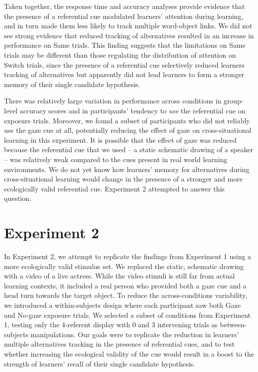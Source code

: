 \documentclass[authoryear, review]{elsarticle}
\begin{document}
Taken together, the response time and accuracy analyses provide evidence
that the presence of a referential cue modulated learners' attention
during learning, and in turn made them less likely to track multiple
word-object links. We did not see strong evidence that reduced tracking
of alternatives resulted in an increase in performance on Same trials.
This finding suggests that the limitations on Same trials may be
different than those regulating the distribution of attention on Switch
trials, since the presence of a referential cue selectively reduced
learners tracking of alternatives but apparently did not lead learners
to form a stronger memory of their single candidate hypothesis.

There was relatively large variation in performance across conditions in
group-level accuracy scores and in participants' tendency to \emph{use}
the referential cue on exposure trials. Moreover, we found a subset of
participants who did not reliably use the gaze cue at all, potentially
reducing the effect of gaze on cross-situational learning in this
experiment. It is possible that the effect of gaze was reduced because
the referential cue that we used -- a static schematic drawing of a
speaker -- was relatively weak compared to the cues present in real
world learning environments. We do not yet know how learners' memory for
alternatives during cross-situational learning would change in the
presence of a stronger and more ecologically valid referential cue.
Experiment 2 attempted to answer this question.

\section{Experiment 2}\label{experiment-2}

In Experiment 2, we attempt to replicate the findings from Experiment 1
using a more ecologically valid stimulus set. We replaced the static,
schematic drawing with a video of a live actress. While the video
stimuli is still far from actual learning contexts, it included a real
person who provided both a gaze cue and a head turn towards the target
object. To reduce the across-conditions variability, we introduced a
within-subjects design where each participant saw both Gaze and No-gaze
exposure trials. We selected a subset of conditions from Experiment 1,
testing only the 4-referent display with 0 and 3 intervening trials as
between-subjects manipulations. Our goals were to replicate the
reduction in learners' multiple alternatives tracking in the presence of
referential cues, and to test whether increasing the ecological validity
of the cue would result in a boost to the strength of learners' recall
of their single candidate hypothesis.
\end{document}
